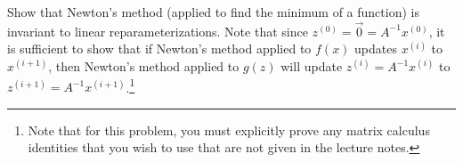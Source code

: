 \item {}  Show that Newton's method (applied to find the
minimum of a function)
is invariant to linear reparameterizations. Note that since $z^{(0)} = \vec{0}
= A^{-1}x^{(0)}$,
it is sufficient to show that if Newton's method applied to $f(x)$
updates  $x^{(i)}$ to  $x^{(i+1)}$, then Newton's method applied to $g(z)$
will update $z^{(i)}=A^{-1}x^{(i)}$ to
$z^{(i+1)}=A^{-1}x^{(i+1)}$.\footnote{Note that for this problem, you must
explicitly prove any matrix calculus identities that you wish to use that are
not given in the lecture notes.} 


